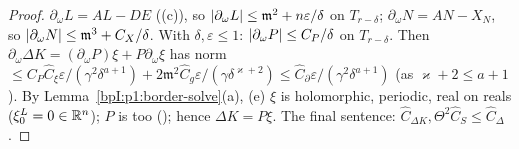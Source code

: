 \begin{proof}
\label{stepI:p2:co-dk}
$\partial_\omega L=AL-DE$ ((c)), so $\lvert \partial_\omega L\rvert\le\mathfrak m^2+n\varepsilon/\delta$ on $T_{r-\delta}$; $\partial_\omega N=AN-X_N$, so $\lvert \partial_\omega N\rvert\le\mathfrak m^3+C_X/\delta$. With $\delta,\varepsilon\le1$: $\lvert \partial_\omega P\rvert\le C_P/\delta$ on $T_{r-\delta}$. Then $\partial_\omega\Delta K=(\partial_\omega P)\xi+P\partial_\omega\xi$ has norm $\le C_P\hat C_\xi\varepsilon/(\gamma^2\delta^{a+1})+2\mathfrak m^2\hat C_g\varepsilon/(\gamma\delta^{\varkappa+2})\le\hat C_\partial\varepsilon/(\gamma^2\delta^{a+1})$ (as $\varkappa+2\le a+1$).
\label{stepI:p2:co-reg}
By Lemma~\ref{bpI:p1:border-solve}(a), (e) $\xi$ is holomorphic, periodic, real on reals ($\xi^L_0=0\in\mathbb{R}^n$); $P$ is too (); hence $\Delta K=P\xi$. The final sentence: $\hat C_{\Delta K},\Theta^2\hat C_S\le\hat C_\Delta$.
\end{proof}

